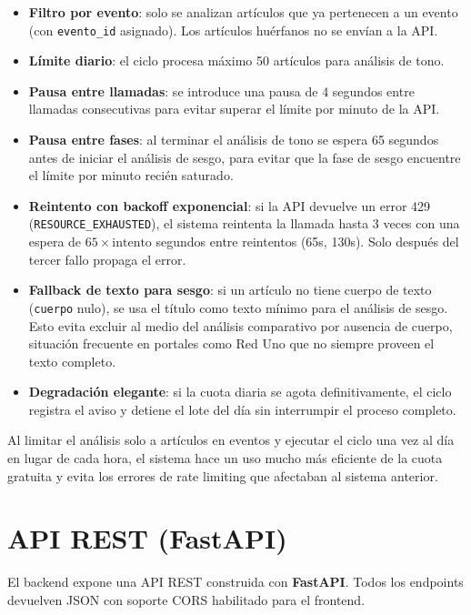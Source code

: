 \documentclass[12pt,a4paper]{article}
\begin{document}
\begin{itemize}[nosep]
  \item \textbf{Filtro por evento}: solo se analizan artículos que ya pertenecen a un evento (con \texttt{evento\_id} asignado). Los artículos huérfanos no se envían a la API.
  \item \textbf{Límite diario}: el ciclo procesa máximo 50 artículos para análisis de tono.
  \item \textbf{Pausa entre llamadas}: se introduce una pausa de 4 segundos entre llamadas consecutivas para evitar superar el límite por minuto de la API.
  \item \textbf{Pausa entre fases}: al terminar el análisis de tono se espera 65 segundos antes de iniciar el análisis de sesgo, para evitar que la fase de sesgo encuentre el límite por minuto recién saturado.
  \item \textbf{Reintento con backoff exponencial}: si la API devuelve un error 429 (\texttt{RESOURCE\_EXHAUSTED}), el sistema reintenta la llamada hasta 3 veces con una espera de $65 \times \text{intento}$ segundos entre reintentos (65s, 130s). Solo después del tercer fallo propaga el error.
  \item \textbf{Fallback de texto para sesgo}: si un artículo no tiene cuerpo de texto (\texttt{cuerpo} nulo), se usa el título como texto mínimo para el análisis de sesgo. Esto evita excluir al medio del análisis comparativo por ausencia de cuerpo, situación frecuente en portales como Red Uno que no siempre proveen el texto completo.
  \item \textbf{Degradación elegante}: si la cuota diaria se agota definitivamente, el ciclo registra el aviso y detiene el lote del día sin interrumpir el proceso completo.
\end{itemize}

Al limitar el análisis solo a artículos en eventos y ejecutar el ciclo una vez al día en lugar de cada hora, el sistema hace un uso mucho más eficiente de la cuota gratuita y evita los errores de rate limiting que afectaban al sistema anterior.

\section{API REST (FastAPI)}

El backend expone una API REST construida con \textbf{FastAPI}. Todos los endpoints devuelven JSON con soporte CORS habilitado para el frontend.
\end{document}
